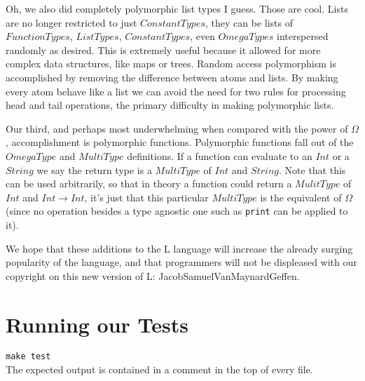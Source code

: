 \documentclass[12pt]{article}
\begin{document}
Oh, we also did completely polymorphic list types I guess. Those are cool. Lists are no longer restricted to just $ConstantTypes$, they can be lists of $FunctionTypes$, $ListTypes$, $ConstantTypes$, even $OmegaTypes$ interspersed randomly as desired. This is extremely useful because it allowed for more complex data structures, like maps or trees. Random access polymorphism is accomplished by removing the difference between atoms and lists. By making every atom behave like a list we can avoid the need for two rules for processing head and tail operations, the primary difficulty in making polymorphic lists.

Our third, and perhaps most underwhelming when compared with the power of $\Omega$, accomplishment is polymorphic functions. Polymorphic functions fall out of the $OmegaType$ and $MultiType$ definitions. If a function can evaluate to an $Int$ or a $String$ we say the return type is a $MultiType$ of $Int$ and $String$. Note that this can be used arbitrarily, so that in theory a function could return a $MulitType$ of $Int$ and $Int\rightarrow Int$, it's just that this particular $MultiType$ is the equivalent of $\Omega$ (since no operation besides a type agnostic one such as \texttt{print} can be applied to it).

We hope that these additions to the L language will increase the already surging popularity of the language, and that programmers will not be displeased with our copyright on this new version of L: JacobSamuelVanMaynardGeffen\textcopyright.

\section{Running our Tests}
\texttt{make test}\\
The expected output is contained in a comment in the top of every file.
\end{document}
